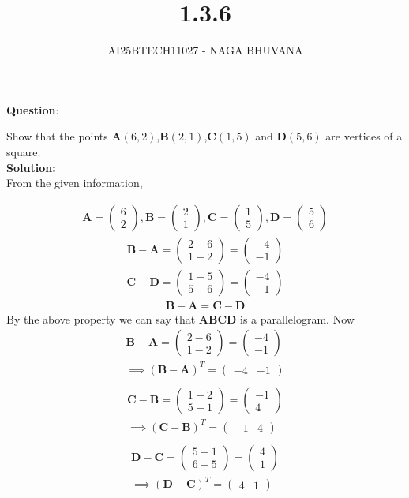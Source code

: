 \documentclass{beamer}
\title{1.3.6}
\author{AI25BTECH11027 - NAGA BHUVANA}
\providecommand{\brak}[1]{\ensuremath{\left(#1\right)}}
\theoremstyle{remark}
\newcommand{\myvec}[1]{\ensuremath{\begin{pmatrix}#1\end{pmatrix}}}
\let\vec\mathbf
\numberwithin{equation}{section}
\begin{document}
{\let\newpage\relax\maketitle}
\renewcommand{\thefigure}{\theenumi}
\renewcommand{\thetable}{\theenumi}
		\textbf{Question}:

		\noindent Show that the points $\textbf{A}\brak{6,2}$,$\textbf{B}\brak{2,1}$,$\textbf{C}\brak{1,5}$ and $\textbf{D}\brak{5,6}$ are vertices of a square.\\
		\textbf{Solution:}\\
        From the given information,


		\begin{align}
			\vec{A} = \myvec{6\\2} ,\vec{B}=\myvec{2\\1} ,\vec{C}=\myvec{1\\5} , \vec{D}=\myvec{5\\6}
		\end{align}
		\begin{align}
		    \vec{B}-\vec{A}=\myvec{2-6\\1-2}=\myvec{-4\\-1}
		\end{align}
        \begin{align}
            \vec{C}-\vec{D}=\myvec{1-5\\5-6}=\myvec{-4\\-1}
        \end{align}
        \begin{align}
            \vec{B}-\vec{A}=\vec{C}-\vec{D}
        \end{align}
        By the above property we can say that \textbf{ABCD} is a parallelogram.
        Now \begin{align}
            \vec{B-A}=\myvec{2-6\\1-2}=\myvec{-4\\-1}\\
            \implies \vec{(B-A)}^T=\myvec{-4 & -1}\\
            \end{align}
            \begin{align}
            \vec{C-B}=\myvec{1-2\\5-1}=\myvec{-1\\4}\\
            \implies \vec{(C-B)}^T=\myvec{-1 & 4}\\
            \end{align}
            \begin{align}
            \vec{D-C}=\myvec{5-1\\6-5}=\myvec{4\\1}\\
            \implies \vec{(D-C)}^T=\myvec{4 & 1}\\
            \end{align}
\end{document}
